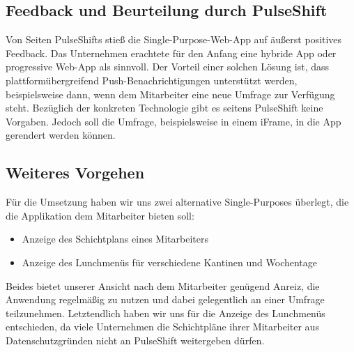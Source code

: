 \subsection{Feedback und Beurteilung durch PulseShift}

Von Seiten PulseShifts stieß die Single-Purpose-Web-App auf äußerst positives Feedback. Das Unternehmen erachtete für den Anfang eine hybride App oder progressive Web-App als sinnvoll. Der Vorteil einer solchen Lösung ist, dass plattformübergreifend Push-Benachrichtigungen unterstützt werden, beispielsweise dann, wenn dem Mitarbeiter eine neue Umfrage zur Verfügung steht. Bezüglich der konkreten Technologie gibt es seitens PulseShift keine Vorgaben. Jedoch soll die Umfrage, beispielsweise in einem iFrame, in die App gerendert werden können.


\subsection{Weiteres Vorgehen}

Für die Umsetzung haben wir uns zwei alternative Single-Purposes überlegt, die die Applikation dem Mitarbeiter bieten soll:

\begin{itemize}
\item Anzeige des Schichtplans eines Mitarbeiters
\item Anzeige des Lunchmenüs für verschiedene Kantinen und Wochentage
\end{itemize}

Beides bietet unserer Ansicht nach dem Mitarbeiter genügend Anreiz, die Anwendung regelmäßig zu nutzen und dabei gelegentlich an einer Umfrage teilzunehmen. Letztendlich haben wir uns für die Anzeige des Lunchmenüs entschieden, da viele Unternehmen die Schichtpläne ihrer Mitarbeiter aus Datenschutzgründen nicht an PulseShift weitergeben dürfen.